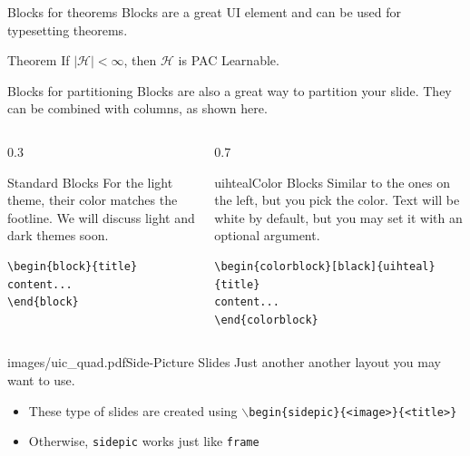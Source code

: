 \documentclass{beamer}
\begin{document}
\begin{frame}[fragile]{Blocks for theorems}
Blocks are a great UI element and can be used for typesetting theorems.
\begin{block}{Theorem}
If $\mid \mathcal{H} \mid < \infty$, then $\mathcal{H}$ is PAC Learnable.
\end{block}
\end{frame}


\begin{frame}[fragile]{Blocks for partitioning}
Blocks are also a great way to partition your slide. They can be combined with columns, as shown here.
\begin{columns}
\begin{column}{0.3\textwidth}
\begin{block}{Standard Blocks}
For the light theme, their color matches the footline. We will discuss light and dark themes soon.
\begin{verbatim}
\begin{block}{title}
content...
\end{block}
\end{verbatim}
\end{block}
\end{column}
\begin{column}{0.7\textwidth}
\begin{colorblock}[black]{uihteal}{Color Blocks}
Similar to the ones on the left, but you pick the color. Text will be white by 
default, but you may set it with an optional argument.
\small
\begin{verbatim}
\begin{colorblock}[black]{uihteal}{title}
content...
\end{colorblock}
\end{verbatim}
\end{colorblock}
\end{column}
\end{columns}
\end{frame}


\begin{sidepic}{images/uic_quad.pdf}{Side-Picture Slides}
Just another another layout you may want to use.
\begin{itemize}
\item These type of slides are created using \texttt{$\backslash$begin\{sidepic\}\{<image>\}\{<title>\}}
\item Otherwise, \texttt{sidepic} works just like \texttt{frame}
\end{itemize}
\end{sidepic}
\end{document}
